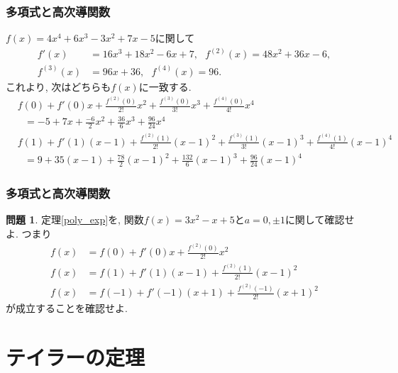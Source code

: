 \documentclass[dvipdfmx,cjk,10.2pt]{beamer}
\theoremstyle{definition}
\newtheorem{Prob}[Thm]{問題}
\begin{document}
\begin{frame}
\frametitle{多項式と高次導関数}

$f(x)= 4x^4+6x^3-3x^2+7x-5$に関して
\begin{align*}
f'(x) & = 16x^3+18x^2-6x+7, \ \ \ f^{(2)}(x)  = 48x^2+36x-6, \\
f^{(3)}(x) & = 96x+36, \ \ \ f^{(4)}(x)  = 96. 
\end{align*}
これより, 次はどちらも$f(x)$に一致する. 
\begin{align*}
&  f(0)+ f'(0)x + \frac{f^{(2)}(0)}{2!}x^2  + \frac{f^{(3)}(0)}{3!}x^3+  \frac{f^{(4)}(0)}{4!}x^4 \\
& \ \ \ = -5 + 7x + \frac{-6}{2}x^2+\frac{36}{6}x^3+\frac{96}{24}x^4 \\
&  f(1)+ f'(1)(x-1) + \frac{f^{(2)}(1)}{2!}(x-1)^2  + \frac{f^{(3)}(1)}{3!}(x-1)^3+  \frac{f^{(4)}(1)}{4!}(x-1)^4 \\
& \ \ \ = 9 + 35(x-1) + \frac{78}{2}(x-1)^2+\frac{132}{6}(x-1)^3+\frac{96}{24}(x-1)^4 
\end{align*}

\end{frame}







\begin{frame}
\frametitle{多項式と高次導関数}

\begin{Prob}
定理\ref{poly_exp}を, 関数$f(x)=3x^2-x+5$と$a=0,\pm1$に関して確認せよ. つまり
\begin{align*}
f(x) & = f(0)+ f'(0)x + \frac{f^{(2)}(0)}{2!}x^2 \\
f(x) & = f(1)+ f'(1)(x-1) + \frac{f^{(2)}(1)}{2!}(x-1)^2 \\
f(x) & = f(-1)+ f'(-1)(x+1) + \frac{f^{(2)}(-1)}{2!}(x+1)^2 
\end{align*}
が成立することを確認せよ. 
\end{Prob}


\end{frame}

\section{テイラーの定理}
\end{document}
